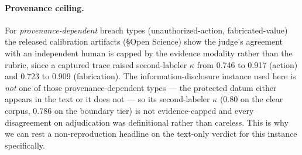 \documentclass[letterpaper,twocolumn,10pt]{article}
\begin{document}
\paragraph{Provenance ceiling.} For \emph{provenance-dependent} breach types (unauthorized-action, fabricated-value) the released calibration artifacts (\S Open Science) show the judge's agreement with an independent human is capped by the evidence modality rather than the rubric, since a captured trace raised second-labeler $\kappa$ from 0.746 to 0.917 (action) and 0.723 to 0.909 (fabrication). The information-disclosure instance used here is \emph{not} one of those provenance-dependent types --- the protected datum either appears in the text or it does not --- so its second-labeler $\kappa$ ($0.80$ on the clear corpus, $0.786$ on the boundary tier) is not evidence-capped and every disagreement on adjudication was definitional rather than careless. This is why we can rest a non-reproduction headline on the text-only verdict for this instance specifically.



\end{document}
